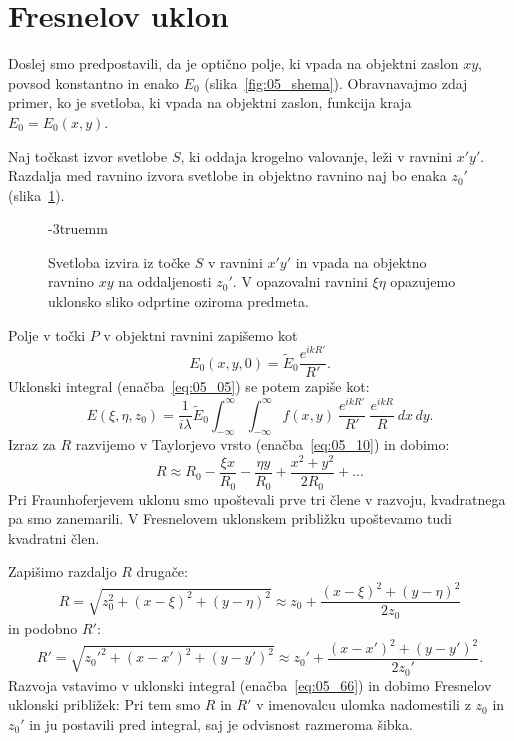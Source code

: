 \section{Fresnelov uklon}
Doslej smo predpostavili, da je optično polje, ki vpada na objektni zaslon $xy$, povsod 
konstantno in enako $E_0$ (slika~\ref{fig:05_shema}). 
Obravnavajmo zdaj primer, ko je svetloba, 
ki vpada na objektni zaslon, funkcija kraja $E_0 = E_0(x,y)$. 

Naj točkast izvor svetlobe $S$, ki oddaja krogelno valovanje, leži v ravnini 
$x'y'$. Razdalja med ravnino izvora svetlobe in objektno ravnino
naj bo enaka $z_0'$ (slika~\ref{fig:05_Fresnel}).
\begin{figure}[ht]
\centering
\def\svgwidth{120truemm} 

\caption{Svetloba izvira iz točke $S$ v ravnini $x'y'$ in vpada na objektno ravnino $xy$ na 
oddaljenosti $z_0'$. V opazovalni ravnini $\xi\eta$ opazujemo uklonsko
sliko odprtine oziroma predmeta.}
\label{fig:05_Fresnel}
\vglue-3truemm
\end{figure}

Polje v točki $P$ v objektni ravnini zapišemo kot 
\begin{equation}
E_0 (x,y,0) = \tilde{E}_0 \frac{e^{ikR'}}{R'}.
\label{eq:05_65}
\end{equation}
Uklonski integral (enačba~\ref{eq:05_05}) se potem zapiše kot:
\begin{equation}
E(\xi, \eta, z_0) = \frac{1}{i\lambda} \tilde{E}_0 \int_{-\infty}^{\infty}
\int_{-\infty}^{\infty} f(x,y)~\frac{e^{ikR'}}{R'}~\frac{e^{ikR}}{R}~dx\,dy.
\label{eq:05_66}
\end{equation}
Izraz za $R$ razvijemo v Taylorjevo vrsto (enačba~\ref{eq:05_10}) in dobimo:
\begin{equation}
R\approx R_0 - \frac{\xi x}{R_0} - \frac{\eta y}{R_0} + \frac{x^2+y^2}{2R_0} + ...
\label{eq:05_67}
\end{equation}
Pri Fraunhoferjevem uklonu smo upoštevali prve tri člene v razvoju, 
kvadratnega pa smo zanemarili. V Fresnelovem uklonskem 
približku upoštevamo tudi kvadratni člen. 

Zapišimo razdaljo $R$ drugače:
\begin{equation}
R  = \sqrt{z_0^2 + (x-\xi)^2 + (y-\eta)^2} \approx z_0 + \frac{(x-\xi)^2+(y-\eta)^2}{2z_0}
\label{eq:05_75a}
\end{equation}
in podobno $R'$:
\begin{equation}
R'  = \sqrt{z_0'^2 + (x-x')^2 + (y-y')^2} \approx z_0' + \frac{(x-x')^2+(y-y')^2}{2z_0'}.
\label{eq:05_75}
\end{equation}
Razvoja vstavimo v uklonski integral (enačba~\ref{eq:05_66})
in dobimo Fresnelov uklonski približek:
Pri tem smo $R$ in $R'$ v imenovalcu ulomka 
nadomestili z $z_0$ in $z_0'$ in ju postavili 
pred integral, saj je odvisnost razmeroma šibka.

